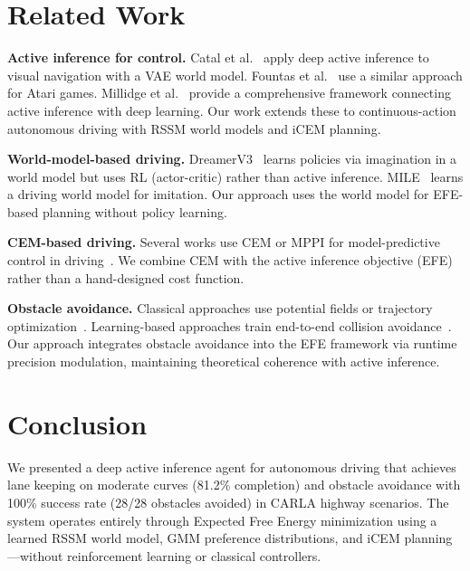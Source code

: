 \documentclass[conference]{IEEEtran}
\begin{document}
\section{Related Work}
\label{sec:related}

\textbf{Active inference for control.} Catal et al.~\cite{catal2020learning} apply deep active inference to visual navigation with a VAE world model. Fountas et al.~\cite{fountas2020deep} use a similar approach for Atari games. Millidge et al.~\cite{millidge2020deep} provide a comprehensive framework connecting active inference with deep learning. Our work extends these to continuous-action autonomous driving with RSSM world models and iCEM planning.

\textbf{World-model-based driving.} DreamerV3~\cite{hafner2023mastering} learns policies via imagination in a world model but uses RL (actor-critic) rather than active inference. MILE~\cite{hu2022model} learns a driving world model for imitation. Our approach uses the world model for EFE-based planning without policy learning.

\textbf{CEM-based driving.} Several works use CEM or MPPI for model-predictive control in driving~\cite{williams2017information}. We combine CEM with the active inference objective (EFE) rather than a hand-designed cost function.

\textbf{Obstacle avoidance.} Classical approaches use potential fields or trajectory optimization~\cite{gonzalez2015review}. Learning-based approaches train end-to-end collision avoidance~\cite{chen2020learning}. Our approach integrates obstacle avoidance into the EFE framework via runtime precision modulation, maintaining theoretical coherence with active inference.

\section{Conclusion}
\label{sec:conclusion}

We presented a deep active inference agent for autonomous driving that achieves lane keeping on moderate curves (81.2\% completion) and obstacle avoidance with 100\% success rate (28/28 obstacles avoided) in CARLA highway scenarios. The system operates entirely through Expected Free Energy minimization using a learned RSSM world model, GMM preference distributions, and iCEM planning---without reinforcement learning or classical controllers.
\end{document}
